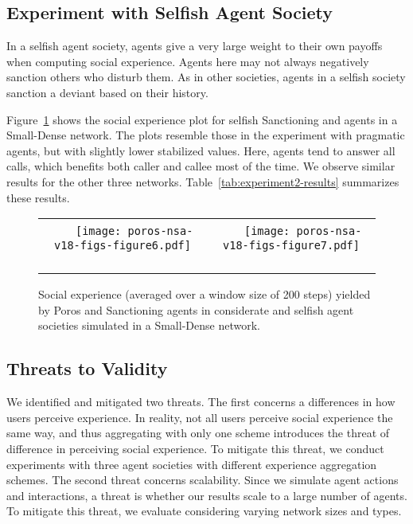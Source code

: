\subsection{Experiment with Selfish Agent Society} 
In a selfish agent society, agents give a very large weight to their own payoffs 
when computing social experience. Agents here may not always negatively sanction 
others who disturb them. As in other societies, agents in a selfish society sanction a deviant based on their history.

Figure~\ref{fig:experiment2-considerate-selfish}
shows the social experience plot for selfish Sanctioning and \frameworkB agents
in a Small-Dense network. The plots resemble those in the
experiment with pragmatic agents, but with slightly lower stabilized
values. Here, agents tend to answer all calls, which benefits both
caller and callee most of the time. We observe similar results for the
other three networks. Table~\ref{tab:experiment2-results} summarizes
these results. 

\begin{figure}[!tb]
\centering
    
\begin{tabular}{@{}cc@{}}
~~~
\texttt{[image: poros-nsa-v18-figs-figure6.pdf]}
~~~
&
~~~
\texttt{[image: poros-nsa-v18-figs-figure7.pdf]}
~~~
\end{tabular}
\caption[Social experience plots for considerate and selfish agents]{Social experience (averaged over a window size of 200 steps)
yielded by Poros and Sanctioning agents in considerate and selfish agent societies simulated in a Small-Dense network.}
\label{fig:experiment2-considerate-selfish}

\end{figure}

\subsection{Threats to Validity}

We identified and mitigated two threats. The first concerns
a differences in how users perceive experience.
In reality, not all users perceive social experience the same way, and thus aggregating with only one scheme introduces the threat of difference in perceiving social experience. To mitigate this threat, we conduct experiments with three agent societies with different experience aggregation schemes.
%
The second threat concerns scalability. Since we simulate agent actions and interactions, a threat is whether our results scale to a large number of agents. To mitigate this threat, we evaluate \frameworkB considering varying network sizes and types. 

